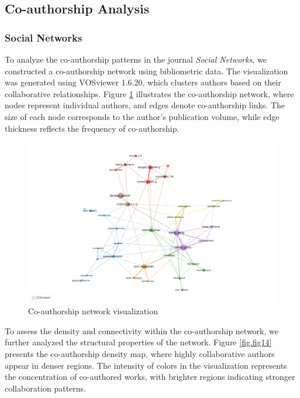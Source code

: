 \documentclass[twocolumn]{article}
\begin{document}
		\subsection{Co-authorship Analysis}
		
		\subsubsection*{Social Networks}
		
		To analyze the co-authorship patterns in the journal \textit{Social Networks}, we constructed a co-authorship network using bibliometric data. The visualization was generated using VOSviewer 1.6.20, which clusters authors based on their collaborative relationships. Figure \ref{fig.fig13} illustrates the co-authorship network, where nodes represent individual authors, and edges denote co-authorship links. The size of each node corresponds to the author's publication volume, while edge thickness reflects the frequency of co-authorship.
		
		\begin{figure}[htbp]
			\centering
			\includegraphics[width=\columnwidth]{Social Networks/WOS data/VOS/co-authorship.pdf}
			\caption{Co-authorship network visualization}
			\label{fig.fig13}
		\end{figure}
		
		To assess the density and connectivity within the co-authorship network, we further analyzed the structural properties of the network. Figure \ref{fig.fig14} presents the co-authorship density map, where highly collaborative authors appear in denser regions. The intensity of colors in the visualization represents the concentration of co-authored works, with brighter regions indicating stronger collaboration patterns.
		
\end{document}
